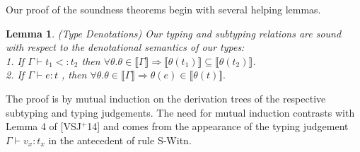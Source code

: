 \documentclass[11pt]{article}
\newtheorem{lemma}[theorem]{Lemma}
\newcommand{\lb}{\llbracket}         %
\newcommand{\rb}{\rrbracket}         %
\newcommand{\many}{\hookrightarrow^*}
\begin{document}
Our proof of the soundness theorems begin with several helping lemmas.

\begin{lemma}{(Type Denotations) Our typing and subtyping relations are sound with respect to the denotational semantics of our types:\\
1. If $\Gamma \vdash t_1 <: t_2$ then $\forall \theta. \theta \in \lb \Gamma \rb \Rightarrow \lb\theta(t_1)\rb \subseteq \lb\theta(t_2)\rb$.\\
2. If $\Gamma \vdash e : t$ %
, then $\forall \theta. \theta \in \lb \Gamma \rb \Rightarrow \theta(e) \in \lb\theta(t)\rb.$
}\label{type-denote}
\end{lemma}

The proof is by mutual induction on the derivation trees of the respective subtyping and typing judgements. The need for mutual induction contrasts with Lemma 4 of [VSJ$^+$14] and comes from the appearance of the typing judgement $\Gamma \vdash v_x : t_x $ in the antecedent of rule {\sc S-Witn}.
     
\end{document}
